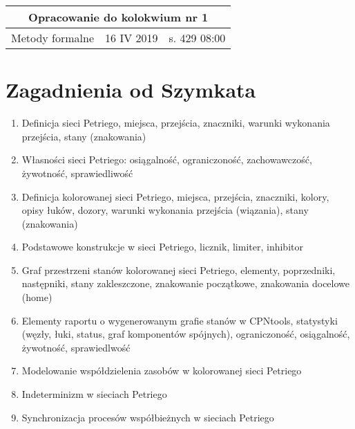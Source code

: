 \documentclass[a4paper,15pt]{article}
\begin{document}
\begin{table}
\begin{center}
\begin{tabular}{|c|c|c|}
\hline
\multicolumn{3}{|c|}{\textbf{Opracowanie do kolokwium nr 1}} \\ \hline Metody formalne & 16 IV 2019 & s. 429 08:00 \\ \hline

\end{tabular}
\end{center}
\end{table}

\tableofcontents

\newpage
\section{Zagadnienia od Szymkata}
\begin{enumerate}
\item Definicja sieci Petriego, miejsca, przejścia, znaczniki, warunki
wykonania przejścia, stany (znakowania)

\item Własności sieci Petriego: osiągalność, ograniczoność, zachowawczość,
żywotność, sprawiedliwość

\item Definicja kolorowanej sieci Petriego, miejsca, przejścia, znaczniki,
kolory, opisy łuków, dozory, warunki wykonania przejścia (wiązania),
stany (znakowania)

\item Podstawowe konstrukcje w sieci Petriego, licznik, limiter, inhibitor

\item Graf przestrzeni stanów kolorowanej sieci Petriego, elementy,
poprzedniki, następniki, stany zakleszczone, znakowanie początkowe,
znakowania docelowe (home)

\item Elementy raportu o wygenerowanym grafie stanów w CPNtools, statystyki
(węzły, łuki, status, graf komponentów spójnych), ograniczoność,
osiągalność, żywotność, sprawiedlwość

\item Modelowanie współdzielenia zasobów w kolorowanej sieci Petriego

\item Indeterminizm w sieciach Petriego

\item Synchronizacja procesów współbieżnych w sieciach Petriego
\end{enumerate}
\end{document}
